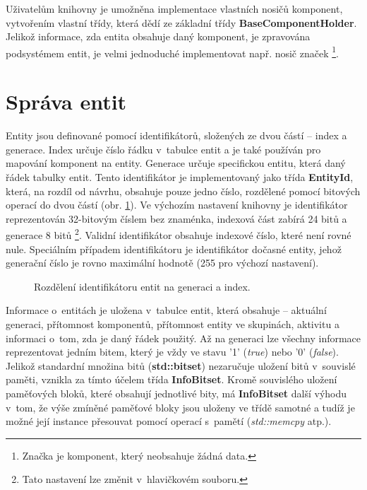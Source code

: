 Uživatelům knihovny je umožněna implementace vlastních nosičů komponent, vytvořením vlastní třídy, která dědí ze základní třídy \textbf{BaseComponentHolder}. Jelikož informace, zda entita obsahuje daný komponent, je zpravována podsystémem entit, je velmi jednoduché implementovat např. nosič značek \footnote{Značka je komponent, který neobsahuje žádná data.}. 

\section{Správa entit}

Entity jsou definované pomocí identifikátorů, složených ze dvou částí -- index a generace. Index určuje číslo řádku v~tabulce entit a je také používán pro mapování komponent na entity. Generace určuje specifickou entitu, která  daný řádek tabulky entit. Tento identifikátor je implementovaný jako třída \textbf{EntityId}, která, na rozdíl od návrhu, obsahuje pouze jedno číslo, rozdělené pomocí bitových operací do dvou částí (obr. \ref{Fig:IMPLIdent}). Ve výchozím nastavení knihovny je identifikátor reprezentován 32-bitovým číslem bez znaménka, indexová část zabírá 24 bitů a generace 8 bitů \footnote{Tato nastavení lze změnit v~hlavičkovém souboru.}. Validní identifikátor obsahuje indexové číslo, které není rovné nule. Speciálním případem identifikátoru je identifikátor dočasné entity, jehož generační číslo je rovno maximální hodnotě (255 pro výchozí nastavení).

\begin{figure}[H]
	\begin{center}
	\end{center}
	\caption{Rozdělení identifikátoru entit na generaci a index.}
	\label{Fig:IMPLIdent}
\end{figure}

Informace o~entitách je uložena v~tabulce entit, která obsahuje -- aktuální generaci, přítomnost komponentů, přítomnost entity ve skupinách, aktivitu a informaci o~tom, zda je daný řádek použitý. Až na generaci lze všechny informace reprezentovat jedním bitem, který je vždy ve stavu '1' (\emph{true}) nebo '0' (\emph{false}). Jelikož standardní množina bitů (\textbf{std::bitset}) nezaručuje uložení bitů v~souvislé paměti, vznikla za tímto účelem třída \textbf{InfoBitset}. Kromě souvislého uložení paměťových bloků, které obsahují jednotlivé bity, má \textbf{InfoBitset} další výhodu v~tom, že výše zmíněné paměťové bloky jsou uloženy ve třídě samotné a tudíž je možné její instance přesouvat pomocí operací s~pamětí (\emph{std::memcpy} atp.).

